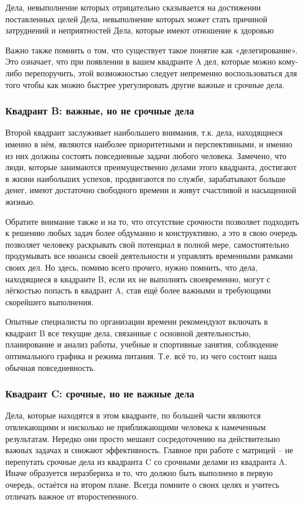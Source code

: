     Дела, невыполнение которых отрицательно сказывается на достижении поставленных целей
    Дела, невыполнение которых может стать причиной затруднений и неприятностей
    Дела, которые имеют отношение к здоровью

Важно также помнить о том, что существует такое понятие как «делегирование». Это означает, что при появлении в вашем квадранте A дел, которые можно кому-либо перепоручить, этой возможностью следует непременно воспользоваться для того чтобы как можно быстрее урегулировать другие важные и срочные дела.

\subsubsection{Квадрант B: важные, но не срочные дела }


Второй квадрант заслуживает наибольшего внимания, т.к. дела, находящиеся именно в нём, являются наиболее приоритетными и перспективными, и именно из них должны состоять повседневные задачи любого человека. Замечено, что люди, которые занимаются преимущественно делами этого квадранта, достигают в жизни наибольших успехов, продвигаются по службе, зарабатывают больше денег, имеют достаточно свободного времени и живут счастливой и насыщенной жизнью.

Обратите внимание также и на то, что отсутствие срочности позволяет подходить к решению любых задач более обдуманно и конструктивно, а это в свою очередь позволяет человеку раскрывать свой потенциал в полной мере, самостоятельно продумывать все нюансы своей деятельности и управлять временными рамками своих дел. Но здесь, помимо всего прочего, нужно помнить, что дела, находящиеся в квадранте B, если их не выполнять своевременно, могут с лёгкостью попасть в квадрант A, став ещё более важными и требующими скорейшего выполнения.

Опытные специалисты по организации времени рекомендуют включать в квадрант B все текущие дела, связанные с основной деятельностью, планирование и анализ работы, учебные и спортивные занятия, соблюдение оптимального графика и режима питания. Т.е. всё то, из чего состоит наша обычная повседневность.

\subsubsection{Квадрант C: срочные, но не важные дела }


Дела, которые находятся в этом квадранте, по большей части являются отвлекающими и нисколько не приближающими человека к намеченным результатам. Нередко они просто мешают сосредоточению на действительно важных задачах и снижают эффективность. Главное при работе с матрицей – не перепутать срочные дела из квадранта C со срочными делами из квадранта A. Иначе образуется неразбериха и то, что должно быть выполнено в первую очередь, остаётся на втором плане. Всегда помните о своих целях и учитесь отличать важное от второстепенного.

